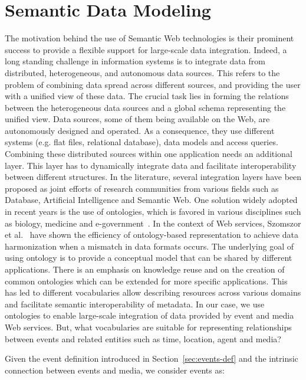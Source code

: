 \section{Semantic Data Modeling}   \label{sec:data-modeling}
The motivation behind the use of Semantic Web technologies is their prominent success to provide a flexible support for large-scale data integration. Indeed, a long standing challenge in information systems is to integrate data from distributed, heterogeneous, and autonomous data sources. This refers to the problem of combining data spread across different sources, and providing the user with a unified view of these data. The crucial task lies in forming the relations between the heterogeneous data sources and a global schema representing the unified view. Data sources, some of them being available on the Web, are autonomously designed and operated. As a consequence, they use different systems (e.g. flat files, relational database), data models and access queries. Combining these distributed sources within one application needs an additional layer. This layer has to dynamically integrate data and facilitate interoperability between different structures. In the literature, several integration layers have been proposed as joint efforts of research communities from various fields such as Database, Artificial Intelligence and Semantic Web. One solution widely adopted in recent years is the use of ontologies, which is favored in various disciplines such as biology, medicine and e-government~\cite{Shadbolt:SWR06}. In the context of Web services, Szomszor et al.~\cite{Szomszor:CCGrid05} have shown the efficiency of ontology-based representation to achieve data harmonization when a mismatch in data formats occurs. The underlying goal of using ontology is to provide a conceptual model that can be shared by different applications. There is an emphasis on knowledge reuse and on the creation of common ontologies which can be extended for more specific applications. This has led to different vocabularies allow describing resources across various domains and facilitate semantic interoperability of metadata. In our case, we use ontologies to enable large-scale integration of data provided by event and media Web services. But, what vocabularies are suitable for representing relationships between events and related entities such as time, location, agent and media? 

Given the event definition introduced in Section~\ref{sec:events-def} and the intrinsic connection between events and media, we consider events as:

